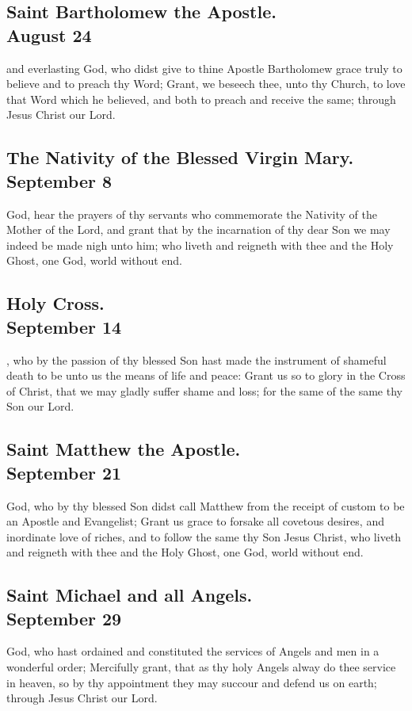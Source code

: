 \subsection{Saint Bartholomew the Apostle.\\
August 24}
 and everlasting God, who didst give to thine Apostle Bartholomew grace truly to believe and to preach thy Word; Grant, we beseech thee, unto thy Church, to love that Word which he believed, and both to preach and receive the same; through Jesus Christ our Lord.

\subsection{The Nativity of the Blessed Virgin Mary.\\
September 8}
 God, hear the prayers of thy servants who commemorate the Nativity of the Mother of the Lord, and grant that by the incarnation of thy dear Son we may indeed be made nigh unto him; who liveth and reigneth with thee and the Holy Ghost, one God, world without end.

\subsection{Holy Cross.\\
September 14}
, who by the passion of thy blessed Son hast made the instrument of shameful death to be unto us the means of life and peace: Grant us so to glory in the Cross of Christ, that we may gladly suffer shame and loss; for the same of the same thy Son our Lord.

\subsection{Saint Matthew the Apostle.\\
September 21}
 God, who by thy blessed Son didst call Matthew from the receipt of custom to be an Apostle and Evangelist; Grant us grace to forsake all covetous desires, and inordinate love of riches, and to follow the same thy Son Jesus Christ, who liveth and reigneth with thee and the Holy Ghost, one God, world without end.

\subsection{Saint Michael and all Angels.\\
September 29}
 God, who hast ordained and constituted the services of Angels and men in a wonderful order; Mercifully grant, that as thy holy Angels alway do thee service in heaven, so by thy appointment they may succour and defend us on earth; through Jesus Christ our Lord.


